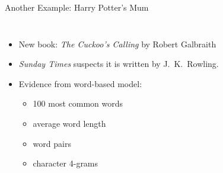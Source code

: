 \documentclass[professionalfonts, xcolor={usenames,svgnames,x11names,table}]{beamer}
\begin{document}
\begin{frame}{Another Example: Harry Potter's Mum}
    \begin{columns}
        \begin{itemize}
            \item New book: \emph{The Cuckoo's Calling} by Robert Galbraith
            \item \emph{Sunday Times} suspects it is written by J.~K.~Rowling.
            \item Evidence from word-based model: 
            \begin{itemize}
                \item 100 most common words
                \item average word length
                \item word pairs\\
                \item character 4-grams\\
            \end{itemize}
        \end{itemize}


\end{columns}
\end{frame}
\end{document}
